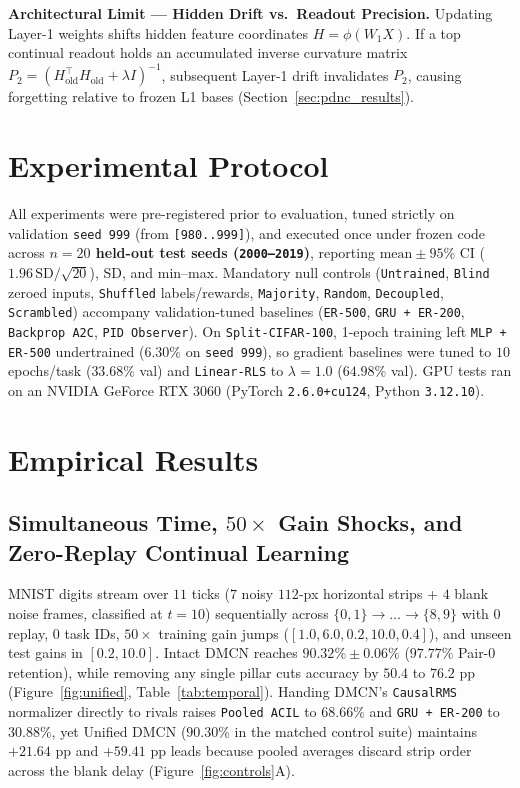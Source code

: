 \documentclass[11pt,a4paper]{article}
\begin{document}
\textbf{Architectural Limit --- Hidden Drift vs.\ Readout Precision.} Updating Layer-1 weights shifts hidden feature coordinates $H = \phi(W_1 X)$. If a top continual readout holds an accumulated inverse curvature matrix $P_2 = (H_{\text{old}}^\top H_{\text{old}} + \lambda I)^{-1}$, subsequent Layer-1 drift invalidates $P_2$, causing forgetting relative to frozen L1 bases (Section~\ref{sec:pdnc_results}).

\section{Experimental Protocol}

All experiments were pre-registered prior to evaluation, tuned strictly on validation \texttt{seed 999} (from \texttt{[980..999]}), and executed once under frozen code across \textbf{$n = 20$ held-out test seeds (\texttt{2000--2019})}, reporting $\text{mean} \pm 95\%\text{ CI}$ ($1.96\,\text{SD}/\sqrt{20}$), SD, and min--max. Mandatory null controls (\texttt{Untrained}, \texttt{Blind} zeroed inputs, \texttt{Shuffled} labels/rewards, \texttt{Majority}, \texttt{Random}, \texttt{Decoupled}, \texttt{Scrambled}) accompany validation-tuned baselines (\texttt{ER-500}, \texttt{GRU + ER-200}, \texttt{Backprop A2C}, \texttt{PID Observer}). On \texttt{Split-CIFAR-100}, 1-epoch training left \texttt{MLP + ER-500} undertrained ($6.30\%$ on \texttt{seed 999}), so gradient baselines were tuned to $10$ epochs/task ($33.68\%$ val) and \texttt{Linear-RLS} to $\lambda = 1.0$ ($64.98\%$ val). GPU tests ran on an NVIDIA GeForce RTX 3060 (PyTorch \texttt{2.6.0+cu124}, Python \texttt{3.12.10}).

\section{Empirical Results}

\subsection{Simultaneous Time, \texorpdfstring{$50\times$}{50x} Gain Shocks, and Zero-Replay Continual Learning}
MNIST digits stream over $11$ ticks ($7$ noisy $112$-px horizontal strips + $4$ blank noise frames, classified at $t=10$) sequentially across $\{0,1\}\to\dots\to\{8,9\}$ with $0$ replay, $0$ task IDs, $50\times$ training gain jumps ($[1.0, 6.0, 0.2, 10.0, 0.4]$), and unseen test gains in $[0.2, 10.0]$. Intact DMCN reaches \textbf{$90.32\% \pm 0.06\%$} ($97.77\%$ Pair-0 retention), while removing any single pillar cuts accuracy by $50.4$ to $76.2\text{ pp}$ (Figure~\ref{fig:unified}, Table~\ref{tab:temporal}). Handing DMCN's \texttt{CausalRMS} normalizer directly to rivals raises \texttt{Pooled ACIL} to $68.66\%$ and \texttt{GRU + ER-200} to $30.88\%$, yet Unified DMCN ($90.30\%$ in the matched control suite) maintains $+21.64\text{ pp}$ and $+59.41\text{ pp}$ leads because pooled averages discard strip order across the blank delay (Figure~\ref{fig:controls}A).
\end{document}
